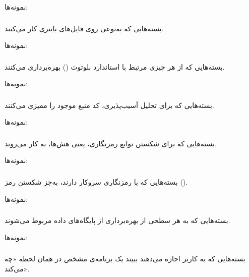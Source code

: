 \documentclass[a4paper, oneside, 11pt]{book}
\begin{document}
نمونه‌ها: 

\subsubsection{}
بسته‌هایی که به‌نوعی روی فایل‌های باینری کار می‌کنند.

نمونه‌ها: 

\subsubsection{}
بسته‌هایی که از هر چیزی مرتبط با استاندارد بلوتوث () بهره‌برداری
می‌کنند.

نمونه‌ها: 

\subsubsection{}
بسته‌هایی که برای تحلیل آسیب‌پذیری، کد منبع موجود را ممیزی می‌کنند.

نمونه‌ها: 

\subsubsection{}
بسته‌هایی که برای شکستن توابع رمزنگاری، یعنی هش‌ها، به کار می‌روند.

نمونه‌ها: 

\subsubsection{}
بسته‌هایی که با رمزنگاری سروکار دارند، به‌جز شکستن رمز ().

نمونه‌ها: 

\subsubsection{}
بسته‌هایی که به هر سطحی از بهره‌برداری از پایگاه‌های داده مربوط می‌شوند.

نمونه‌ها: 

\subsubsection{}
بسته‌هایی که به کاربر اجازه می‌دهند ببیند یک برنامه‌ی مشخص در همان لحظه
«چه می‌کند».
\end{document}
